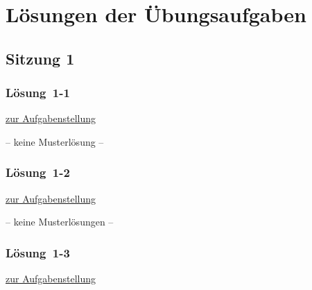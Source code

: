 \documentclass[
  11pt,
  ngerman,
  a4paper,
]{report}
\begin{document}
\hypertarget{luxf6sungen-der-uxfcbungsaufgaben}{%
\chapter*{Lösungen der Übungsaufgaben}\label{luxf6sungen-der-uxfcbungsaufgaben}}

\hypertarget{sitzung-1}{%
\section*{Sitzung 1}\label{sitzung-1}}

\hypertarget{loesung-1-1}{%
\subsection{Lösung~1-1}\label{loesung-1-1}}

\protect\hyperlink{aufgabe-1-1}{zur Aufgabenstellung}

-- keine Musterlösung --

\hypertarget{loesung-1-2}{%
\subsection{Lösung~1-2}\label{loesung-1-2}}

\protect\hyperlink{aufgabe-1-2}{zur Aufgabenstellung}

-- keine Musterlösungen --

\hypertarget{loesung-1-3}{%
\subsection{Lösung~1-3}\label{loesung-1-3}}

\protect\hyperlink{aufgabe-1-3}{zur Aufgabenstellung}
\end{document}
